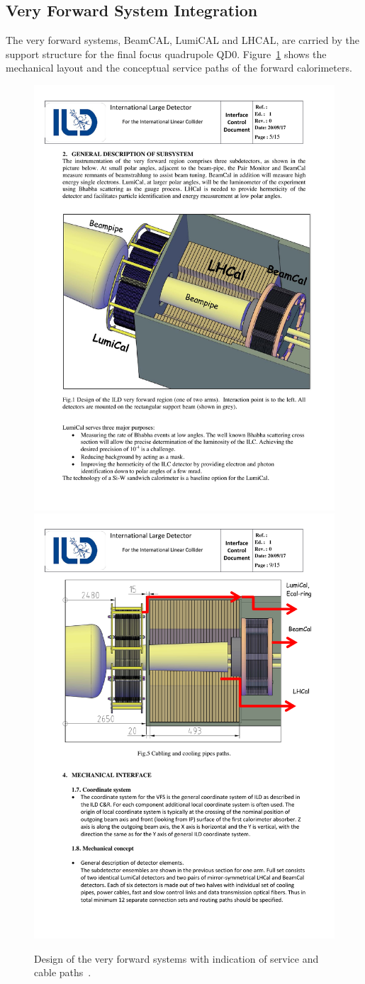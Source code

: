 
\subsection{Very Forward System Integration}
The very forward systems, BeamCAL, LumiCAL and LHCAL, are carried by the support structure for the final focus quadrupole QD0. Figure~\ref{ILD:fig:vfs_integration} shows the mechanical layout and the conceptual service paths of the forward calorimeters.
\begin{figure}[h!]
    \centering
    \includegraphics[width=0.45\hsize]{Integration/fig/VFS_Design.pdf}
        \includegraphics[width=0.45\hsize]{Integration/fig/VFS_Services.pdf}
    \caption{Design of the very forward systems with indication of service and cable paths~\cite{ild:bib:VFS_ICD}.}
    \label{ILD:fig:vfs_integration}
\end{figure}
